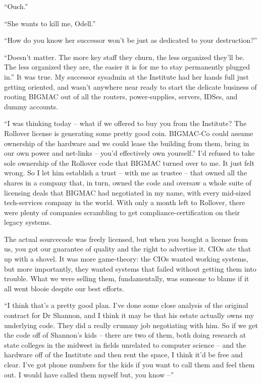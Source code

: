“Ouch.”

“She wants to kill me, Odell.”

“How do you know her successor won't be just as dedicated to your 
destruction?”

“Doesn't matter. The more key staff they churn, the less organized 
they'll be. The less organized they are, the easier it is for me to 
stay permanently plugged in.” It was true. My successor sysadmin at 
the Institute had her hands full just getting oriented, and wasn't 
anywhere near ready to start the delicate business of rooting BIGMAC 
out of all the routers, power-supplies, servers, IDSes, and dummy 
accounts.

“I was thinking today -- what if we offered to buy you from the 
Institute? The Rollover license is generating some pretty good coin. 
BIGMAC-Co could assume ownership of the hardware and we could lease the 
building from them, bring in our own power and net-links -- you'd 
effectively own yourself.” I'd refused to take sole ownership of the 
Rollover code that BIGMAC turned over to me. It just felt wrong. So I 
let him establish a trust -- with me as trustee -- that owned all the 
shares in a company that, in turn, owned the code and oversaw a whole 
suite of licensing deals that BIGMAC had negotiated in my name, with 
every mid-sized tech-services company in the world. With only a month 
left to Rollover, there were plenty of companies scrambling to get 
compliance-certification on their legacy systems.

The actual sourcecode was freely licensed, but when you bought a 
license from us, you got our guarantee of quality and the right to 
advertise it. CIOs ate that up with a shovel. It was more game-theory: 
the CIOs wanted working systems, but more importantly, they wanted 
systems that failed without getting them into trouble. What we were 
selling them, fundamentally, was someone to blame if it all went blooie 
despite our best efforts.

“I think that's a pretty good plan. I've done some close analysis of 
the original contract for Dr Shannon, and I think it may be that his 
estate actually owns my underlying code. They did a really crummy job 
negotiating with him. So if we get the code off of Shannon's kids -- 
there are two of them, both doing research at state colleges in the 
midwest in fields unrelated to computer science -- and the hardware off 
of the Institute and then rent the space, I think it'd be free and 
clear. I've got phone numbers for the kids if you want to call them and 
feel them out. I would have called them myself but, you know --”

